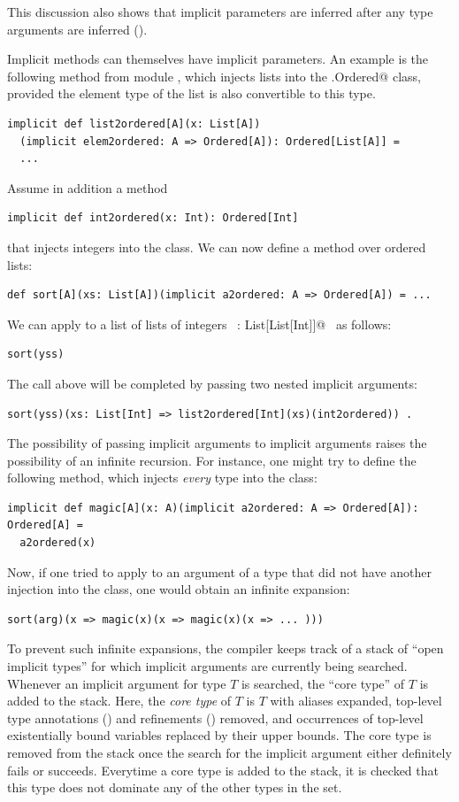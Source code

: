 This discussion also shows that implicit parameters are inferred after
any type arguments are inferred (). 

Implicit methods can themselves have implicit parameters. An example
is the following method from module , which injects
lists into the \lstinline@scala.Ordered@ class, provided the element
type of the list is also convertible to this type.
\begin{lstlisting}
implicit def list2ordered[A](x: List[A])
  (implicit elem2ordered: A => Ordered[A]): Ordered[List[A]] = 
  ...
\end{lstlisting}
Assume in addition a method
\begin{lstlisting}
implicit def int2ordered(x: Int): Ordered[Int]
\end{lstlisting}
that injects integers into the \lstinline@Ordered@ class.  We can now
define a  method over ordered lists:
\begin{lstlisting}
def sort[A](xs: List[A])(implicit a2ordered: A => Ordered[A]) = ...
\end{lstlisting}
We can apply  to a list of lists of integers ~\lstinline@yss: List[List[Int]]@~ 
as follows:
\begin{lstlisting}
sort(yss)
\end{lstlisting}
The call above will be completed by passing two nested implicit arguments:
\begin{lstlisting}
sort(yss)(xs: List[Int] => list2ordered[Int](xs)(int2ordered)) .
\end{lstlisting}
The possibility of passing implicit arguments to implicit arguments
raises the possibility of an infinite recursion.  For instance, one
might try to define the following method, which injects {\em every} type into the \lstinline@Ordered@ class:
\begin{lstlisting}
implicit def magic[A](x: A)(implicit a2ordered: A => Ordered[A]): Ordered[A] = 
  a2ordered(x)
\end{lstlisting}
Now, if one tried to apply
\lstinline@sort@ to an argument  of a type that did not have
another injection into the  class, one would obtain an infinite
expansion:
\begin{lstlisting}
sort(arg)(x => magic(x)(x => magic(x)(x => ... )))
\end{lstlisting}
To prevent such infinite expansions, the compiler keeps track of 
a stack of ``open implicit types'' for which implicit arguments are currently being
searched. Whenever an implicit argument for type $T$ is searched, the
``core type'' of $T$ is added to the stack. Here, the {\em core type}
of $T$ is $T$ with aliases expanded, top-level type annotations () and
refinements () removed, and occurrences
of top-level existentially bound variables replaced by their upper
bounds. The core type is removed from the stack once the search for
the implicit argument either definitely fails or succeeds. Everytime a
core type is added to the stack, it is checked that this type does not
dominate any of the other types in the set.

